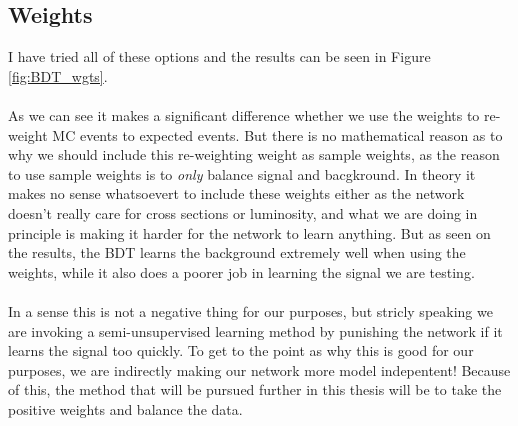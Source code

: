 \documentclass[12pt, a4paper]{book}
\begin{document}
\subsection{Weights}
I have tried all of these options and the results can be seen in Figure \ref{fig:BDT_wgts}.\\
\\As we can see it makes a significant difference whether we use the weights to re-weight MC events to expected events. But there is no mathematical reason as to why we should 
include this re-weighting weight as sample weights, as the reason to use sample weights is to \textit{only} balance signal and bacgkround. In theory it makes no sense whatsoevert to include these weights either 
as the network doesn't really care for cross sections or luminosity, and what we are doing in principle is making it harder for the network to learn anything. But as seen on the results, the BDT learns the background 
extremely well when using the weights, while it also does a poorer job in learning the signal we are testing.\\ 
\\In a sense this is not a negative thing for our purposes, but stricly speaking we are invoking a semi-unsupervised learning method by punishing the network if it learns the signal too quickly. 
To get to the point as why this is good for our purposes, we are indirectly making our network more model indepentent! Because of this, the method that will be pursued further in this thesis will be to 
take the positive weights and balance the data.
\end{document}
